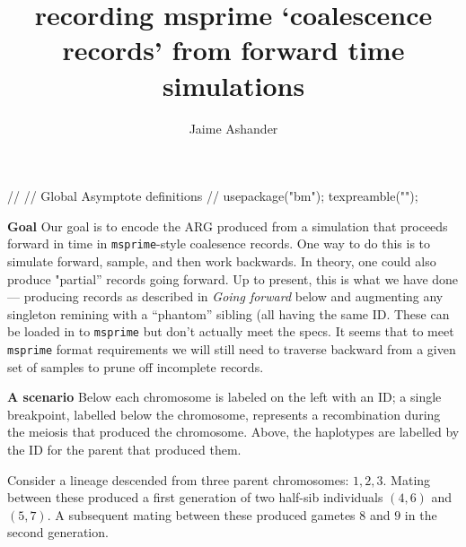 \documentclass[12pt]{article}
\title{recording msprime `coalescence records' from forward time simulations}
\author{Jaime Ashander}
\date{}
\begin{document}
\maketitle

\begin{asydef}
//
// Global Asymptote definitions
//
usepackage("bm");
texpreamble("\def\V#1{\bm{#1}}");
\end{asydef}

{\bf Goal} Our goal is to encode the ARG produced  from a simulation that
proceeds forward in time in {\tt msprime}-style coalesence records.
One way to do this is to simulate forward, sample, and then work backwards.
In theory, one could also produce "partial'' records going forward.
Up to present, this is what we have done --- producing records as described in
{\it Going forward} below and augmenting any singleton remining with a
``phantom'' sibling (all having the same ID.
These can be loaded in to {\tt msprime} but don't actually meet the specs.
It seems that to meet {\tt msprime} format requirements we will still need to
traverse backward from a given set of samples to prune off incomplete records.

{ \bf A scenario}
Below each chromosome is labeled on the left with an ID; a single breakpoint,
labelled below the chromosome, represents a recombination during the meiosis
that produced the chromosome.
Above, the haplotypes are labelled by the ID for the parent that produced them.

Consider a lineage descended from three parent chromosomes: $1,2,3$.
Mating between these produced a first generation of two half-sib individuals
$(4,6)$ and $(5,7)$.
A subsequent mating between these produced gametes $8$ and $9$ in the second generation.
\end{document}
